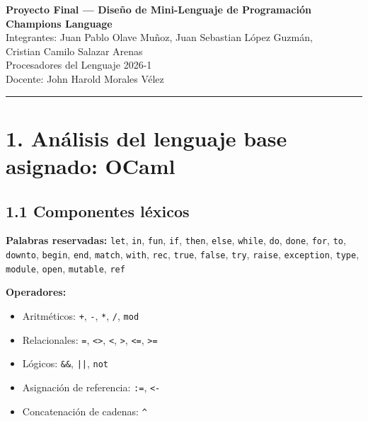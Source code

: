 \documentclass[12pt,a4paper]{article}
\begin{document}
\begin{center}
  {\LARGE\bfseries Proyecto Final --- Diseño de Mini-Lenguaje de Programación}\\[1em]
  {\large\bfseries Champions Language}\\[1.5em]
    Integrantes:
    Juan Pablo Olave Muñoz, Juan Sebastian López Guzmán, \\
    Cristian Camilo Salazar Arenas \\
    
  Procesadores del Lenguaje 2026-1 \\
  Docente: John Harold Morales Vélez
\end{center}

\bigskip
\hrule
\bigskip

\section*{1. Análisis del lenguaje base asignado: OCaml}

\subsection*{1.1 Componentes léxicos}

\textbf{Palabras reservadas:}
\texttt{let}, \texttt{in}, \texttt{fun}, \texttt{if}, \texttt{then}, \texttt{else},
\texttt{while}, \texttt{do}, \texttt{done}, \texttt{for}, \texttt{to}, \texttt{downto},
\texttt{begin}, \texttt{end}, \texttt{match}, \texttt{with}, \texttt{rec},
\texttt{true}, \texttt{false}, \texttt{try}, \texttt{raise}, \texttt{exception},
\texttt{type}, \texttt{module}, \texttt{open}, \texttt{mutable}, \texttt{ref}

\textbf{Operadores:}
\begin{itemize}
  \item Aritméticos: \texttt{+}, \texttt{-}, \texttt{*}, \texttt{/}, \texttt{mod}
  \item Relacionales: \texttt{=}, \texttt{<>}, \texttt{<}, \texttt{>}, \texttt{<=}, \texttt{>=}
  \item Lógicos: \texttt{\&\&}, \texttt{||}, \texttt{not}
  \item Asignación de referencia: \texttt{:=}, \texttt{<-}
  \item Concatenación de cadenas: \texttt{\^{}}
\end{itemize}
\end{document}
